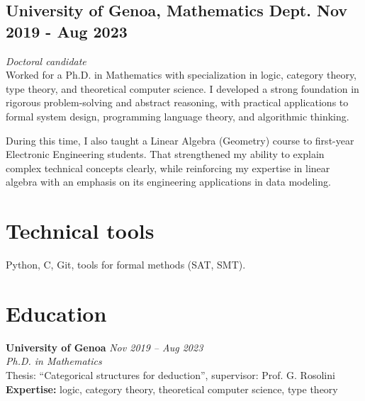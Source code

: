 \documentclass[a4paper,10pt]{article}
\begin{document}
\subsection*{University of Genoa, Mathematics Dept. \hfill Nov 2019 - Aug 2023}
\textit{Doctoral candidate}\\
Worked for a Ph.D. in Mathematics with specialization in logic, category theory, type theory, and theoretical computer science. I developed a strong foundation in rigorous problem-solving and abstract reasoning, with practical applications to formal system design, programming language theory, and algorithmic thinking.

During this time, I also taught a Linear Algebra (Geometry) course to first-year Electronic Engineering students. That strengthened my ability to explain complex technical concepts clearly, while reinforcing my expertise in linear algebra with an emphasis on its engineering applications in data modeling.


\section*{ Technical tools}
Python, C, Git, tools for formal methods (SAT, SMT).

\pagebreak

\section*{ Education}
\textbf{University of Genoa} \hfill \textit{Nov 2019 -- Aug 2023} \\
\textit{Ph.D. in Mathematics} \\
Thesis: ``Categorical structures for deduction'', supervisor: Prof. G. Rosolini \\
\textbf{Expertise:} logic, category theory, theoretical computer science, type theory 
\end{document}
